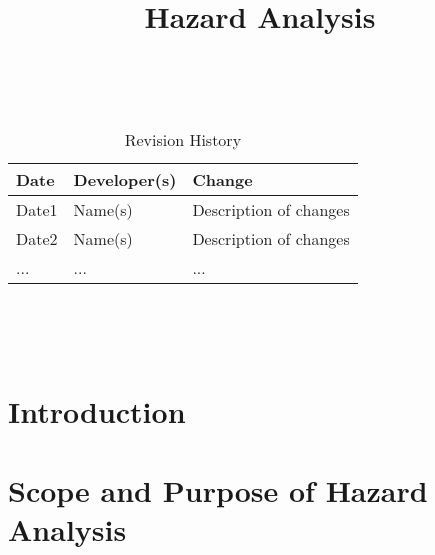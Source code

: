 \documentclass{article}
\title{Hazard Analysis\\\progname}
\author{\authname}
\date{}
\begin{document}
\maketitle
\thispagestyle{empty}

~\newpage


\begin{table}[hp]
\caption{Revision History} \label{TblRevisionHistory}
\begin{tabularx}{\textwidth}{llX}
\toprule
\textbf{Date} & \textbf{Developer(s)} & \textbf{Change}\\
\midrule
Date1 & Name(s) & Description of changes\\
Date2 & Name(s) & Description of changes\\
... & ... & ...\\
\bottomrule
\end{tabularx}
\end{table}

~\newpage

\tableofcontents

~\newpage









\section{Introduction}





\section{Scope and Purpose of Hazard Analysis}

\end{document}

